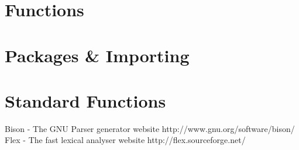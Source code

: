\documentclass[]{final_report}
\begin{document}
\chapter{Functions}

\chapter{Packages \& Importing}

\chapter{Standard Functions}

\newpage
\begin{thebibliography}{99}
 Bison - The GNU Parser generator website http://www.gnu.org/software/bison/
 Flex - The fast lexical analyser website http://flex.sourceforge.net/
\end{thebibliography}
\label{endpage}
\end{document}
